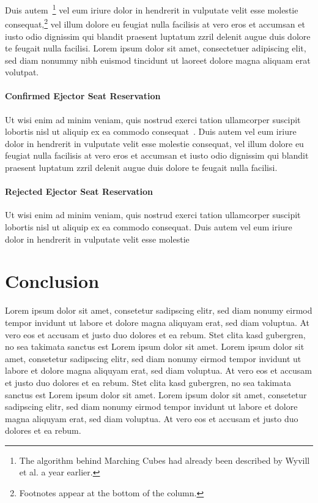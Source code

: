 \documentclass[journal]{vgtc}                %
\begin{document}
Duis autem~\cite{Lorensen:1987:MCA}\footnote{The algorithm behind
Marching Cubes \cite{Lorensen:1987:MCA} had already been
described by Wyvill et al. \cite{Wyvill:1986:DSS} a year
earlier.} vel eum iriure dolor in hendrerit
in vulputate velit esse molestie consequat,\footnote{Footnotes
appear at the bottom of the column.} vel illum dolore eu
feugiat nulla facilisis at vero eros et accumsan et iusto odio
dignissim qui blandit praesent luptatum zzril delenit augue duis
dolore te feugait nulla facilisi. Lorem ipsum dolor sit amet,
consectetuer adipiscing elit, sed diam nonummy nibh euismod tincidunt
ut laoreet dolore magna aliquam erat volutpat.


\paragraph{Confirmed Ejector Seat Reservation}

Ut wisi enim ad minim veniam, quis nostrud exerci tation ullamcorper
suscipit lobortis nisl ut aliquip ex ea commodo
consequat~\cite{Nielson:1991:TAD}. Duis autem vel eum iriure dolor in
hendrerit in vulputate velit esse molestie consequat, vel illum dolore
eu feugiat nulla facilisis at vero eros et accumsan et iusto odio
dignissim qui blandit praesent luptatum zzril delenit augue duis
dolore te feugait nulla facilisi.

\paragraph{Rejected Ejector Seat Reservation}

Ut wisi enim ad minim veniam, quis nostrud exerci tation ullamcorper
suscipit lobortis nisl ut aliquip ex ea commodo consequat. Duis autem
vel eum iriure dolor in hendrerit in vulputate velit esse molestie


\section{Conclusion}

Lorem ipsum dolor sit amet, consetetur sadipscing elitr, sed diam
nonumy eirmod tempor invidunt ut labore et dolore magna aliquyam erat,
sed diam voluptua. At vero eos et accusam et justo duo dolores et ea
rebum. Stet clita kasd gubergren, no sea takimata sanctus est Lorem
ipsum dolor sit amet. Lorem ipsum dolor sit amet, consetetur
sadipscing elitr, sed diam nonumy eirmod tempor invidunt ut labore et
dolore magna aliquyam erat, sed diam voluptua. At vero eos et accusam
et justo duo dolores et ea rebum. Stet clita kasd gubergren, no sea
takimata sanctus est Lorem ipsum dolor sit amet. Lorem ipsum dolor sit
amet, consetetur sadipscing elitr, sed diam nonumy eirmod tempor
invidunt ut labore et dolore magna aliquyam erat, sed diam
voluptua. At vero eos et accusam et justo duo dolores et ea
rebum.
\end{document}
